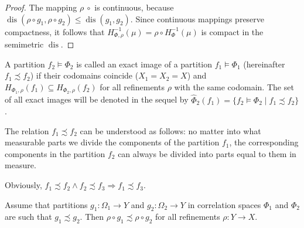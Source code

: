 \begin{proof}
	The mapping $\rho\ \circ$ is continuous, because $\operatorname{dis}(\rho \circ g_1, \rho \circ g_2) \le \operatorname{dis}(g_1, g_2)$. Since continuous mappings preserve compactness\cite[с.~199]{Engelking}, it follows that $H_{\Phi,\rho}^{-1}(\mu) = \rho \circ H_{\Phi}^{-1}(\mu)$ is compact in the semimetric $\operatorname{dis}$. %
\end{proof}

\begin{definition}
	A partition $f_2 \models \Phi_2$ is called an exact image of a partition $f_1 \models \Phi_1$ (hereinafter $f_1 \precsim f_2$) if their codomains coincide ($X_1 = X_2 = X$) and $H_{\Phi_1,\rho}(f_1) \subseteq H_{\Phi_2,\rho}(f_2)$ for all refinements $\rho$ with the same codomain. The set of all exact images will be denoted in the sequel by $\widehat{\Phi}_2(f_1) = \{f_2 \models \Phi_2 \mid f_1 \precsim f_2\}$. %
\end{definition}

The relation $f_1 \precsim f_2$ can be understood as follows: no matter into what measurable parts we divide the components of the partition $f_1$, the corresponding components in the partition $f_2$ can always be divided into parts equal to them in measure. %

\begin{remark}
	Obviously, $f_1 \precsim f_2 \wedge f_2 \precsim f_3 \Rightarrow f_1 \precsim f_3$. %
\end{remark}

\begin{lemma} \label{lemma:up}
	Assume that partitions $g_1 : \Omega_1 \rightarrow Y$ and $g_2 : \Omega_2 \rightarrow Y$ in correlation spaces $\Phi_1$ and $\Phi_2$ are such that $g_1 \precsim g_2$. Then $\rho \circ g_1 \precsim \rho \circ g_2$ for all refinements $\rho : Y \rightarrow X$. %
\end{lemma}

